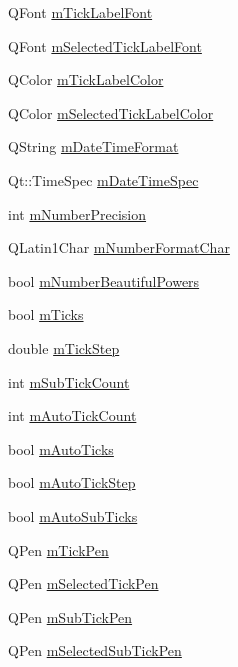 \begin{DoxyCompactItemize}
Q\+Font \hyperlink{classQCPAxis_add79d1e39c4ed65869a1e9cc79043f3f}{m\+Tick\+Label\+Font}
\item 
Q\+Font \hyperlink{classQCPAxis_a4f2e4919da9615dac612662c249b1119}{m\+Selected\+Tick\+Label\+Font}
\item 
Q\+Color \hyperlink{classQCPAxis_a6384a749b3b56a97df081d8082321ab4}{m\+Tick\+Label\+Color}
\item 
Q\+Color \hyperlink{classQCPAxis_a3bcad40902f45dc4c991a2c3e4d31d70}{m\+Selected\+Tick\+Label\+Color}
\item 
Q\+String \hyperlink{classQCPAxis_a0b7ad83550d71daab4cfee2918e168e0}{m\+Date\+Time\+Format}
\item 
Qt\+::\+Time\+Spec \hyperlink{classQCPAxis_af73bec228c1a3203dc8aef1e84a46759}{m\+Date\+Time\+Spec}
\item 
int \hyperlink{classQCPAxis_acd76e8c783384d99ccc4a13797eec188}{m\+Number\+Precision}
\item 
Q\+Latin1\+Char \hyperlink{classQCPAxis_a39594313deef458f425bba25cd337a8a}{m\+Number\+Format\+Char}
\item 
bool \hyperlink{classQCPAxis_af03809bee3f3e35fcc38d25b6dd5003b}{m\+Number\+Beautiful\+Powers}
\item 
bool \hyperlink{classQCPAxis_ab111e74bba22e06848897c932fc549fe}{m\+Ticks}
\item 
double \hyperlink{classQCPAxis_a4fe96830fc5a2711e20fe5edccfe2ed3}{m\+Tick\+Step}
\item 
int \hyperlink{classQCPAxis_ad70198e6ae2801fc409bc3caec707da9}{m\+Sub\+Tick\+Count}
\item 
int \hyperlink{classQCPAxis_a499fbb67111e4b204738f6c1aa28d842}{m\+Auto\+Tick\+Count}
\item 
bool \hyperlink{classQCPAxis_aac23adcbae246bf165d4539ad65ac9f9}{m\+Auto\+Ticks}
\item 
bool \hyperlink{classQCPAxis_aada8934a5c44978653031782aa37d101}{m\+Auto\+Tick\+Step}
\item 
bool \hyperlink{classQCPAxis_aaae980b0d193d959674e314dbb6c2c3b}{m\+Auto\+Sub\+Ticks}
\item 
Q\+Pen \hyperlink{classQCPAxis_a1d52c78c856d8bd1f331d4ec4e63d944}{m\+Tick\+Pen}
\item 
Q\+Pen \hyperlink{classQCPAxis_a9524593dbc75a5c5b29dbd1cb4b37df5}{m\+Selected\+Tick\+Pen}
\item 
Q\+Pen \hyperlink{classQCPAxis_a32ef56d3a417866720eb12667d27dbd1}{m\+Sub\+Tick\+Pen}
\item 
Q\+Pen \hyperlink{classQCPAxis_aa5cc6afc5dc2a365f5abbd36eb04a1dc}{m\+Selected\+Sub\+Tick\+Pen}

\end{DoxyCompactItemize}
